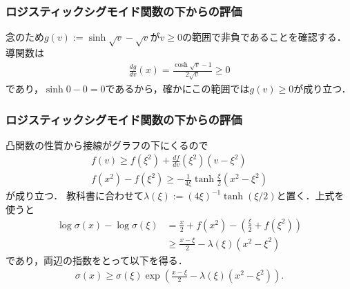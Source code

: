 \documentclass[10pt,hyperref={unicode}]{beamer}
\newcommand{\parentheses}[1]{\left(#1\right)}
\begin{document}
\begin{frame}
\frametitle{ロジスティックシグモイド関数の下からの評価}
念のため$g\parentheses{v} := \sinh \sqrt{v} - \sqrt{v}$が$v \geq 0$の範囲で非負であることを確認する．
導関数は
\begin{align*}
    \frac{dg}{dv}\parentheses{x} = \frac{\cosh \sqrt{v} - 1}{2\sqrt{v}} \geq 0
\end{align*}
であり，$\sinh 0 - 0 = 0$であるから，確かにこの範囲では$g\parentheses{v} \geq 0$が成り立つ．

\smallskip

\begin{center}
\end{center}
\end{frame}

\begin{frame}
\frametitle{ロジスティックシグモイド関数の下からの評価}
凸関数の性質から接線がグラフの下にくるので
\begin{gather*}
    f\parentheses{v} \geq f\parentheses{\xi^2} + \frac{df}{dv}\parentheses{\xi^2}\parentheses{v - \xi^2} \\
    f\parentheses{x^2} - f\parentheses{\xi^2} \geq -\frac{1}{4\xi}\tanh\frac{\xi}{2}\parentheses{x^2 - \xi^2}
\end{gather*}
が成り立つ．
教科書に合わせて$\lambda\parentheses{\xi} := \parentheses{4\xi}^{-1}\tanh\parentheses{\xi/2}$と置く．上式を使うと
\begin{align*}
    \log\sigma\parentheses{x} - \log\sigma\parentheses{\xi}
    &= \frac{x}{2} + f\parentheses{x^2} - \parentheses{\frac{\xi}{2} + f\parentheses{\xi^2}} \\
    &\geq \frac{x - \xi}{2} - \lambda\parentheses{\xi}\parentheses{x^2 - \xi^2}
\end{align*}
であり，両辺の指数をとって以下を得る．
\begin{align}
    \sigma\parentheses{x}
    \geq \sigma\parentheses{\xi}\exp\parentheses{\frac{x - \xi}{2} - \lambda\parentheses{\xi}\parentheses{x^2 - \xi^2}}. \tag{10.144} \label{inf}
\end{align}
\end{frame}
\end{document}

